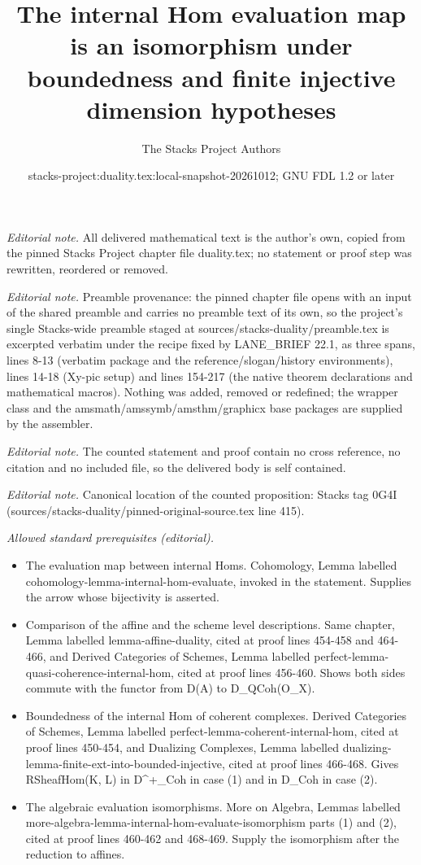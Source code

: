 \documentclass[10pt,a4paper]{amsart}
\title{The internal Hom evaluation map is an isomorphism under boundedness and finite injective dimension hypotheses}
\author{The Stacks Project Authors}
\date{stacks-project:duality.tex:local-snapshot-20261012; GNU FDL 1.2 or later}
\theoremstyle{plain}
\theoremstyle{definition}
\theoremstyle{remark}
\numberwithin{equation}{subsection}
\begin{document}
\maketitle
\noindent\textit{Editorial note.} All delivered mathematical text is the author's own, copied from the pinned Stacks Project chapter file duality.tex; no statement or proof step was rewritten, reordered or removed.\par\medskip
\noindent\textit{Editorial note.} Preamble provenance: the pinned chapter file opens with an input of the shared preamble and carries no preamble text of its own, so the project's single Stacks-wide preamble staged at sources/stacks-duality/preamble.tex is excerpted verbatim under the recipe fixed by LANE\_BRIEF 22.1, as three spans, lines 8-13 (verbatim package and the reference/slogan/history environments), lines 14-18 (Xy-pic setup) and lines 154-217 (the native theorem declarations and mathematical macros). Nothing was added, removed or redefined; the wrapper class and the amsmath/amssymb/amsthm/graphicx base packages are supplied by the assembler.\par\medskip
\noindent\textit{Editorial note.} The counted statement and proof contain no cross reference, no citation and no included file, so the delivered body is self contained.\par\medskip
\noindent\textit{Editorial note.} Canonical location of the counted proposition: Stacks tag 0G4I (sources/stacks-duality/pinned-original-source.tex line 415).\par\medskip
\noindent\textit{Allowed standard prerequisites (editorial).}\begin{itemize}
\item The evaluation map between internal Homs. Cohomology, Lemma labelled cohomology-lemma-internal-hom-evaluate, invoked in the statement. Supplies the arrow whose bijectivity is asserted.
\item Comparison of the affine and the scheme level descriptions. Same chapter, Lemma labelled lemma-affine-duality, cited at proof lines 454-458 and 464-466, and Derived Categories of Schemes, Lemma labelled perfect-lemma-quasi-coherence-internal-hom, cited at proof lines 456-460. Shows both sides commute with the functor from D(A) to D\_QCoh(O\_X).
\item Boundedness of the internal Hom of coherent complexes. Derived Categories of Schemes, Lemma labelled perfect-lemma-coherent-internal-hom, cited at proof lines 450-454, and Dualizing Complexes, Lemma labelled dualizing-lemma-finite-ext-into-bounded-injective, cited at proof lines 466-468. Gives RSheafHom(K, L) in D\textasciicircum{}+\_Coh in case (1) and in D\_Coh in case (2).
\item The algebraic evaluation isomorphisms. More on Algebra, Lemmas labelled more-algebra-lemma-internal-hom-evaluate-isomorphism parts (1) and (2), cited at proof lines 460-462 and 468-469. Supply the isomorphism after the reduction to affines.
\end{itemize}\medskip
\end{document}

